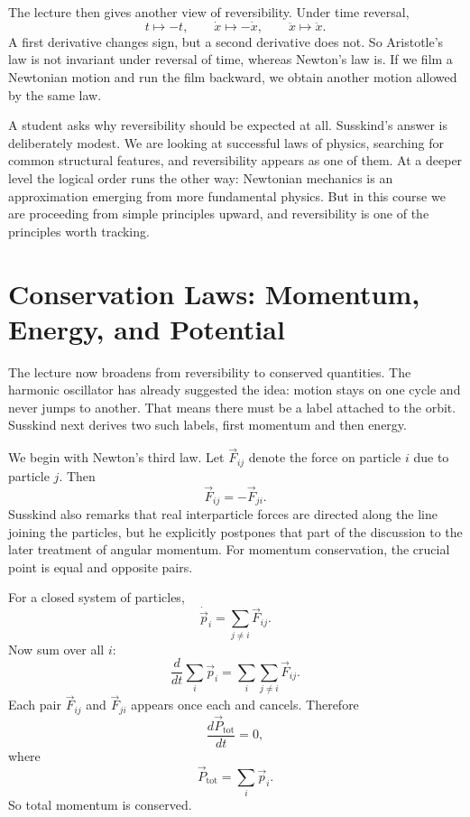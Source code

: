 The lecture then gives another view of reversibility. Under time reversal,
\begin{equation}
t\mapsto -t,\qquad \dot x\mapsto -\dot x,\qquad \ddot x\mapsto \ddot x.
\end{equation}
A first derivative changes sign, but a second derivative does not. So Aristotle's law is not invariant under reversal of time, whereas Newton's law is. If we film a Newtonian motion and run the film backward, we obtain another motion allowed by the same law.

A student asks why reversibility should be expected at all. Susskind's answer is deliberately modest. We are looking at successful laws of physics, searching for common structural features, and reversibility appears as one of them. At a deeper level the logical order runs the other way: Newtonian mechanics is an approximation emerging from more fundamental physics. But in this course we are proceeding from simple principles upward, and reversibility is one of the principles worth tracking.

\section{Conservation Laws: Momentum, Energy, and Potential}

The lecture now broadens from reversibility to conserved quantities. The harmonic oscillator has already suggested the idea: motion stays on one cycle and never jumps to another. That means there must be a label attached to the orbit. Susskind next derives two such labels, first momentum and then energy.

We begin with Newton's third law. Let \(\vec F_{ij}\) denote the force on particle \(i\) due to particle \(j\). Then
\begin{equation}
\vec F_{ij}=-\vec F_{ji}.
\end{equation}
Susskind also remarks that real interparticle forces are directed along the line joining the particles, but he explicitly postpones that part of the discussion to the later treatment of angular momentum. For momentum conservation, the crucial point is equal and opposite pairs.

For a closed system of particles,
\begin{equation}
\dot{\vec p}_i=\sum_{j\ne i}\vec F_{ij}.
\end{equation}
Now sum over all \(i\):
\begin{equation}
\frac{d}{dt}\sum_i \vec p_i=\sum_i\sum_{j\ne i}\vec F_{ij}.
\end{equation}
Each pair \(\vec F_{ij}\) and \(\vec F_{ji}\) appears once each and cancels. Therefore
\begin{equation}
\frac{d\vec P_{\text{tot}}}{dt}=0,
\end{equation}
where
\begin{equation}
\vec P_{\text{tot}}=\sum_i \vec p_i.
\end{equation}
So total momentum is conserved.

